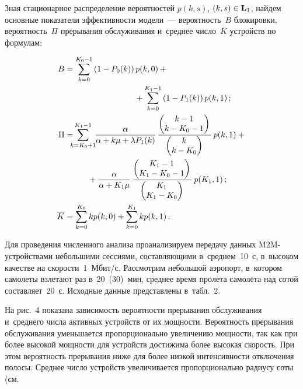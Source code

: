 \begin{multicols}{2}
  Зная стационарное распределение вероятностей  $p(k,s)$, 
  $(k,s)\hm\in \mathbf{L}_1$, найдем 
основные показатели эффективности модели~--- вероятность~$B$ блокировки, 
вероятность~$\Pi$ прерывания обслуживания и~среднее число~$\overline{K}$ 
устройств по формулам:

\noindent
  \begin{align*}
  B &= \sum\limits_{k=0}^{K_0-1} \left( 1-P_0(k)\right) p(k,0) 
+{}\notag\\
&\hspace*{30mm}{}+\sum\limits_{k=0}^{K_1-1}\left( 1-P_1(k)\right) p(k,1)\,;
  \\
  \Pi &=  \hspace*{-2mm}\hspace*{-0.72604pt}\sum\limits_{k=K_0+1}^{K_1-1}
  \hspace*{-1mm}
   \fr{\alpha}{\alpha+k\mu+\lambda 
P_1(k)}\, \fr{\begin{pmatrix} k-1\\ k-K_0-1\end{pmatrix}}{ \begin{pmatrix} k\\ k-
K_0\end{pmatrix}}\,p(k,1)+{}\notag\\
&\hspace*{10mm}{}+\fr{\alpha}{\alpha+K_1\mu}\,\fr{\begin{pmatrix} K_1-
1\\ K_1-K_0-1\end{pmatrix}} {\begin{pmatrix} K_1\\ K_1-K_0\end{pmatrix}} 
\,p(K_1,1)\,;
  \\
  \overline{K} &= \sum\limits_{k=0}^{K_0} kp (k,0) +\sum\limits_{k=0}^{K_1} 
kp(k,1)\,.
  \end{align*}
  
  Для проведения численного анализа проанализируем передачу данных  
M2M-устройствами небольшими сессиями, составляющими в~среднем~10~с, 
в~высоком качестве на ско\-рости~1~Мбит/с. 
Рассмотрим небольшой аэропорт, 
в~котором самолеты взлетают раз в~20~(30)~мин, среднее время пролета 
самолета над сотой составляет~20~с. 
Исходные данные представлены в~табл.~2.
  
  
  
  На рис.~4 показана зависимость вероятности прерывания обслуживания 
и~среднего числа активных устройств от их мощности. Вероятность\linebreak 
прерывания обслуживания уменьшается пропорционально увеличению 
мощности, так как при более высокой мощности для устройств достижима 
более высокая скорость. При этом вероятность прерывания ниже для более 
низкой интен\-сив\-ности отключения полосы.
Среднее число устройств 
увеличивается пропорционально радиусу соты
 (см.\linebreak

\end{multicols}

